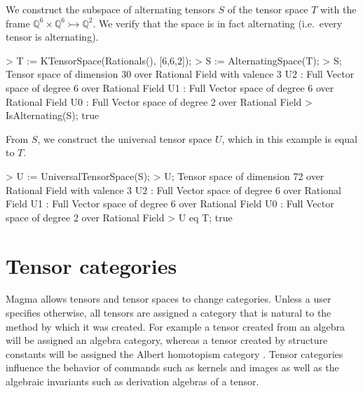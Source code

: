 \begin{example}[UniversalConst]

We construct the subspace of alternating tensors $S$ of the tensor space $T$ with the frame $\mathbb{Q}^6\times\mathbb{Q}^6\rightarrowtail \mathbb{Q}^2$. 
We verify that the space is in fact alternating (i.e.\ every tensor is alternating).
\begin{code}
> T := KTensorSpace(Rationals(), [6,6,2]);
> S := AlternatingSpace(T);
> S;
Tensor space of dimension 30 over Rational Field with valence 3
U2 : Full Vector space of degree 6 over Rational Field
U1 : Full Vector space of degree 6 over Rational Field
U0 : Full Vector space of degree 2 over Rational Field
> IsAlternating(S);
true
\end{code}

From $S$, we construct the universal tensor space $U$, which in this example is equal to $T$. 
\begin{code}
> U := UniversalTensorSpace(S);
> U;
Tensor space of dimension 72 over Rational Field with valence 3
U2 : Full Vector space of degree 6 over Rational Field
U1 : Full Vector space of degree 6 over Rational Field
U0 : Full Vector space of degree 2 over Rational Field
> U eq T;
true
\end{code}
\end{example}





\chapter{Tensor categories}\label{ch:tensor-categories}

Magma allows tensors and tensor spaces to change categories. 
Unless a user specifies otherwise,
all tensors are assigned a category that is natural to the method
by which it was created.
For example a tensor created from an algebra will be assigned an 
algebra category, whereas a tensor created by structure constants
will be assigned the Albert homotopism category \cite{Albert:Fundamentals}.  
Tensor categories influence
the behavior of commands such as kernels and images  
as well as the algebraic invariants such as derivation algebras of a tensor.  

